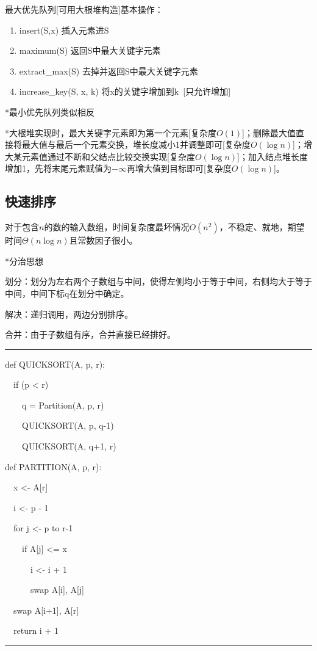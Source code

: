 \documentclass[a4paper,UTF8,fontset=windows]{ctexart}
\newenvironment{code}{\rule{36em}{0.1em}\setlength{\parindent}{1em}

}{

\setlength{\parindent}{0em}\rule{36em}{0.1em}}
\begin{document}
最大优先队列[可用大根堆构造]基本操作：

\begin{enumerate}
    \item insert(S,x) 插入元素进S
    \item maximum(S) 返回S中最大关键字元素
    \item extract\_max(S) 去掉并返回S中最大关键字元素
    \item increase\_key(S, x, k) 将x的关键字增加到k\ [只允许增加]
\end{enumerate}

*\hspace{0em}最小优先队列类似相反

*\hspace{0em}大根堆实现时，最大关键字元素即为第一个元素[复杂度$O(1)$]；删除最大值直接将最大值与最后一个元素交换，堆长度减小1并调整即可[复杂度$O(\log n)$]；增大某元素值通过不断和父结点比较交换实现[复杂度$O(\log n)$]；加入结点堆长度增加1，先将末尾元素赋值为$-\infty$再增大值到目标即可[复杂度$O(\log n)$]。

\subsection{快速排序}

对于包含$n$的数的输入数组，时间复杂度最坏情况$O(n^2)$，不稳定、就地，期望时间$\Theta(n\log n)$且常数因子很小。

*\hspace{0em}分治思想

划分：划分为左右两个子数组与中间，使得左侧均小于等于中间，右侧均大于等于中间，中间下标q在划分中确定。

解决：递归调用，两边分别排序。

合并：由于子数组有序，合并直接已经排好。

\begin{code}
def QUICKSORT(A, p, r):

\ \ if (p < r)

\ \ \ \ q = Partition(A, p, r)

\ \ \ \ QUICKSORT(A, p, q-1)

\ \ \ \ QUICKSORT(A, q+1, r)

def PARTITION(A, p, r):

\ \ x <- A[r]

\ \ i <- p - 1

\ \ for j <- p to r-1

\ \ \ \ if A[j] <= x

\ \ \ \ \ \ i <- i + 1

\ \ \ \ \ \ swap A[i], A[j]

\ \ swap A[i+1], A[r]

\ \ return i + 1
\end{code}
\end{document}
